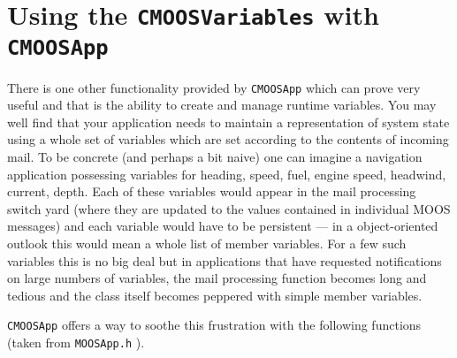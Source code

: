 \documentclass[a4paper,10pt]{article}
\newcommand{\Code}[1]{\texttt{#1} }
\newcommand{\code}[1]{\Code{#1} }
\begin{document}
\section{Using the \code{CMOOSVariables} with \code{CMOOSApp}} \label{Sec:CMOOSVariable}

There is one other functionality provided by \code{CMOOSApp} which can prove very useful and that is the ability to create and manage runtime variables. You may well find that your application needs to maintain a representation of system state using a whole set of variables which are set according to the contents of incoming mail. To be concrete (and perhaps a bit naive) one can imagine a navigation application possessing variables for heading, speed, fuel, engine speed, headwind, current, depth. Each of these variables would appear in the mail processing switch yard (where they are updated to the values contained in individual MOOS messages) and each variable would have to be persistent --- in a object-oriented outlook this would mean a whole list of member variables. For a few such variables this is no big deal but in applications that have requested notifications on large numbers of variables, the mail processing function becomes long and tedious and the class itself becomes peppered with simple member variables.

\code{CMOOSApp} offers a way to soothe this frustration with the following functions (taken from \code{MOOSApp.h}).
\end{document}
